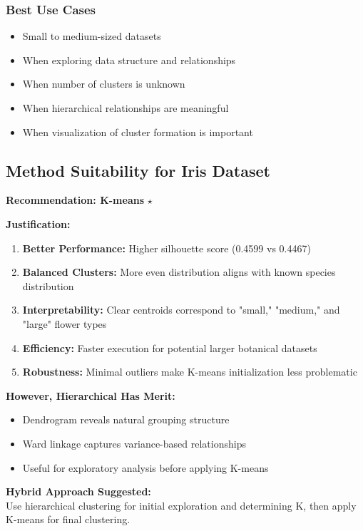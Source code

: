 \documentclass[12pt,a4paper]{article}
\begin{document}
\subsubsection{Best Use Cases}
\begin{itemize}
    \item Small to medium-sized datasets
    \item When exploring data structure and relationships
    \item When number of clusters is unknown
    \item When hierarchical relationships are meaningful
    \item When visualization of cluster formation is important
\end{itemize}

\subsection{Method Suitability for Iris Dataset}

\textbf{Recommendation: K-means} $\star$

\textbf{Justification:}
\begin{enumerate}
    \item \textbf{Better Performance:} Higher silhouette score (0.4599 vs 0.4467)
    \item \textbf{Balanced Clusters:} More even distribution aligns with known species distribution
    \item \textbf{Interpretability:} Clear centroids correspond to "small," "medium," and "large" flower types
    \item \textbf{Efficiency:} Faster execution for potential larger botanical datasets
    \item \textbf{Robustness:} Minimal outliers make K-means initialization less problematic
\end{enumerate}

\textbf{However, Hierarchical Has Merit:}
\begin{itemize}
    \item Dendrogram reveals natural grouping structure
    \item Ward linkage captures variance-based relationships
    \item Useful for exploratory analysis before applying K-means
\end{itemize}

\textbf{Hybrid Approach Suggested:}\\
Use hierarchical clustering for initial exploration and determining K, then apply K-means for final clustering.
\end{document}
